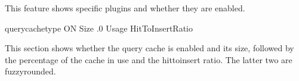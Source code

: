 \documentclass[letterpaper,10pt,english]{sphinxmanual}
\begin{document}
This feature shows specific plugins and whether they are enabled.

\begin{sphinxVerbatim}[commandchars=\\\{\}]
         query\PYGZus{}cache\PYGZus{}type  ON
                     Size  .0
                    Usage  \PYGZpc{}
         HitToInsertRatio  \PYGZpc{}
\end{sphinxVerbatim}

This section shows whether the query cache is enabled and its size, followed by
the percentage of the cache in use and the hit\sphinxhyphen{}to\sphinxhyphen{}insert ratio. The latter two
are fuzzy\sphinxhyphen{}rounded.
\end{document}
